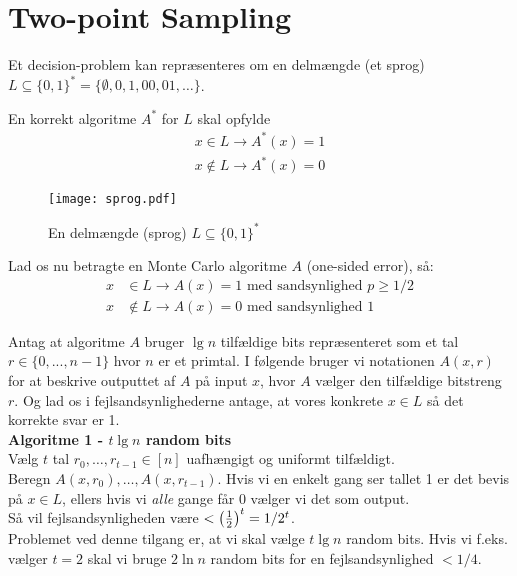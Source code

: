 \section{Two-point Sampling}
Et decision-problem kan repræsenteres om en delmængde (et sprog) $L \subseteq \{0, 1\}^\ast = \{\emptyset, 0, 1, 00, 01, \dots \}$.

En korrekt algoritme $A^\ast$ for $L$ skal opfylde
\begin{align*}
  x \in L \rightarrow A^\ast(x) = 1\\
  x \notin L \rightarrow A^\ast(x) = 0
\end{align*}

\begin{figure}[H]
  \begin{center}
  \texttt{[image: sprog.pdf]}
  \end{center}
  \caption{En delmængde (sprog) $L \subseteq \{0, 1\}^\ast$}
  \label{fig:sprog}
\end{figure}

Lad os nu betragte en Monte Carlo algoritme $A$ (one-sided error), så:
\begin{align*}
  x &\in L \rightarrow A(x) = 1 \text{ med sandsynlighed $p \geq 1/2$}\\
  x &\notin L \rightarrow A(x) = 0 \text{ med sandsynlighed $1$}
\end{align*}

Antag at algoritme $A$ bruger $\lg n$ tilfældige bits repræsenteret som et tal $r \in \{0, ..., n-1 \}$ hvor $n$ er et primtal. I følgende bruger vi notationen $A(x, r)$ for at beskrive outputtet af $A$ på input $x$, hvor $A$ vælger den tilfældige bitstreng $r$. Og lad os i fejlsandsynlighederne antage, at vores konkrete $x \in L$ så det korrekte svar er 1.\\

\textbf{Algoritme 1 - $t \lg n$ random bits}\\
Vælg $t$ tal $r_0, \dots, r_{t-1} \in [n]$ uafhængigt og uniformt tilfældigt.\\
Beregn $A(x, r_0), \dots, A(x, r_{t-1})$. Hvis vi en enkelt gang ser tallet 1 er det bevis på $x \in L$, ellers hvis vi \emph{alle} gange får 0 vælger vi det som output.\\

Så vil fejlsandsynligheden være $< \left(  \frac{1}{2}  \right)^t = 1/2^t$.\\

Problemet ved denne tilgang er, at vi skal vælge $t \lg n$ random bits. Hvis vi f.eks. vælger $t = 2$ skal vi bruge $2 \ln n$ random bits for en fejlsandsynlighed $< 1/4$.\\


